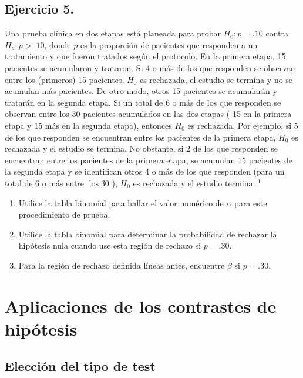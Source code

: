 \documentclass[
]{article}
\providecommand{\tightlist}{%
  \setlength{\itemsep}{0pt}\setlength{\parskip}{0pt}}
\begin{document}
\subsection{Ejercicio 5.}\label{ejercicio-5.}

Una prueba clínica en dos etapas está planeada para probar \(H_{0}: p=.10\) contra \(H_{a}: p>.10\), donde \(p\) es la proporción de pacientes que responden a un tratamiento y que fueron tratados según el protocolo. En la primera etapa, 15 pacientes se acumularon y trataron. Si 4 o más de los que responden se observan entre los (primeros) 15 pacientes, \(H_{0}\) es rechazada, el estudio se termina y no se acumulan más pacientes. De otro modo, otros 15 pacientes se acumularán y tratarán en la segunda etapa. Si un total de 6 o más de los que responden se observan entre los 30 pacientes acumulados en las dos etapas ( 15 en la primera etapa y 15 más en la segunda etapa), entonces \(H_{0}\) es rechazada. Por ejemplo, si 5 de los que responden se encuentran entre los pacientes de la primera etapa, \(H_{0}\) es rechazada y el estudio se termina. No obstante, si 2 de los que responden se encuentran entre los pacientes de la primera etapa, se acumulan 15 pacientes de la segunda etapa y se identifican otros 4 o más de los que responden (para un total de 6 o más entre \(\operatorname{los} 30\) ), \(H_{0}\) es rechazada y el estudio termina. \({ }^{1}\)

\begin{enumerate}
\def\labelenumi{\alph{enumi}.}
\tightlist
\item
  Utilice la tabla binomial para hallar el valor numérico de \(\alpha\) para este procedimiento de prueba.
\item
  Utilice la tabla binomial para determinar la probabilidad de rechazar la hipótesis nula cuando use esta región de rechazo si \(p=.30\).
\item
  Para la región de rechazo definida líneas antes, encuentre \(\beta\) si \(p=.30\).
\end{enumerate}

\section{Aplicaciones de los contrastes de hipótesis}\label{aplicaciones-de-los-contrastes-de-hipuxf3tesis}

\subsection{Elección del tipo de test}\label{elecciuxf3n-del-tipo-de-test}
\end{document}
